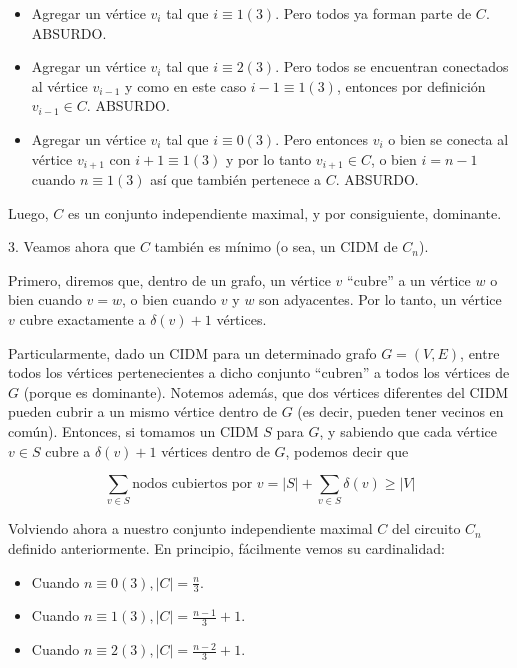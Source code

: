 \begin{itemize}
	\item Agregar un vértice $v_i$ tal que $i \equiv 1 (3)$.  Pero todos ya forman parte de $C$. ABSURDO.
	\item Agregar un vértice $v_i$ tal que $i \equiv 2 (3)$.  Pero todos se encuentran conectados al vértice $v_{i-1}$ y como en este caso $i-1 \equiv 1(3)$, entonces por definición $v_{i-1} \in C$. ABSURDO.
	\item Agregar un vértice $v_i$ tal que $i \equiv 0 (3)$.  Pero entonces $v_i$ o bien se conecta al vértice $v_{i+1}$ con $i+1 \equiv 1 (3)$ y por lo tanto $v_{i+1} \in C$, o bien $i = n-1$ cuando $n \equiv 1 (3)$ así que también pertenece a $C$. ABSURDO.
\end{itemize}

Luego, $C$ es un conjunto independiente maximal, y por consiguiente, dominante. 

3. Veamos ahora que $C$ también es mínimo (o sea, un CIDM de $C_n$).

Primero, diremos que, dentro de un grafo, un vértice $v$ ``cubre'' a un vértice $w$ o bien cuando $v = w$, o bien cuando $v$ y $w$ son adyacentes. Por lo tanto, un vértice $v$ cubre exactamente a $\delta(v) + 1$ vértices.

Particularmente, dado un CIDM para un determinado grafo $G = (V,E)$, entre todos los vértices pertenecientes a dicho conjunto ``cubren'' a todos los vértices de $G$ (porque es dominante). Notemos además, que dos vértices diferentes del CIDM pueden cubrir a un mismo vértice dentro de $G$ (es decir, pueden tener vecinos en común). Entonces, si tomamos un CIDM $S$ para $G$, y sabiendo que cada vértice $v \in S$ cubre a $\delta(v) + 1$ vértices dentro de $G$, podemos decir que 

\begin{equation*}
\sum_{v \in S} \text{nodos cubiertos por }v = |S| + \sum_{v \in S} \delta(v) \geq |V|
\end{equation*}

Volviendo ahora a nuestro conjunto independiente maximal $C$ del circuito $C_n$ definido anteriormente. En principio, fácilmente vemos su cardinalidad:

\begin{itemize}
	\item Cuando $n \equiv 0 (3), |C| = \frac{n}{3}$.
	\item Cuando $n \equiv 1 (3), |C| = \frac{n-1}{3} + 1$.	
	\item Cuando $n \equiv 2 (3), |C| = \frac{n-2}{3} + 1$.	
\end{itemize}


